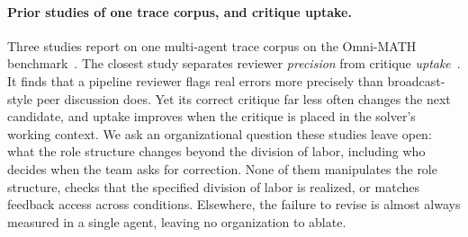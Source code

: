\paragraph{Prior studies of one trace corpus, and critique uptake.} Three
studies report on one multi-agent trace corpus on the Omni-MATH
benchmark~\cite{jiang2026confidence,yang2026protocol,yang2026precise}. The closest study separates
reviewer \emph{precision} from critique
\emph{uptake}~\cite{yang2026precise}. It finds that a pipeline reviewer
flags real errors more precisely than broadcast-style peer discussion does.
Yet its correct critique far less often changes the next candidate, and
uptake improves when the critique is placed in the solver's working context.
We ask an organizational question these studies leave open: what the role
structure changes beyond the division of labor, including who decides when
the team asks for correction. None of them manipulates the role structure,
checks that the specified division of labor is realized, or matches feedback
access across conditions.
Elsewhere, the failure to revise is almost always measured in a single
agent, leaving no organization to ablate.
